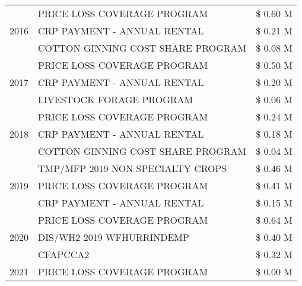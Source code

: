 \begin{tabular}{llr}
\multirow[t]{3}{*}{2016} & PRICE LOSS COVERAGE PROGRAM                   & \$ 0.60 M \\
 & CRP PAYMENT - ANNUAL RENTAL                   & \$ 0.21 M \\
 & COTTON GINNING COST SHARE PROGRAM             & \$ 0.08 M \\
\cline{1-3}
\multirow[t]{3}{*}{2017} & PRICE LOSS COVERAGE PROGRAM & \$ 0.50 M \\
 & CRP PAYMENT - ANNUAL RENTAL & \$ 0.20 M \\
 & LIVESTOCK FORAGE PROGRAM & \$ 0.06 M \\
\cline{1-3}
\multirow[t]{3}{*}{2018} & PRICE LOSS COVERAGE PROGRAM & \$ 0.24 M \\
 & CRP PAYMENT - ANNUAL RENTAL & \$ 0.18 M \\
 & COTTON GINNING COST SHARE PROGRAM & \$ 0.04 M \\
\cline{1-3}
\multirow[t]{3}{*}{2019} & TMP/MFP 2019 NON SPECIALTY CROPS & \$ 0.46 M \\
 & PRICE LOSS COVERAGE PROGRAM & \$ 0.41 M \\
 & CRP PAYMENT - ANNUAL RENTAL & \$ 0.15 M \\
\cline{1-3}
\multirow[t]{3}{*}{2020} & PRICE LOSS COVERAGE PROGRAM & \$ 0.64 M \\
 & DIS/WH2 2019 WFHURRINDEMP & \$ 0.40 M \\
 & CFAPCCA2 & \$ 0.32 M \\
\cline{1-3}
2021 & PRICE LOSS COVERAGE PROGRAM & \$ 0.00 M \\
\cline{1-3}
\bottomrule
\end{tabular}
